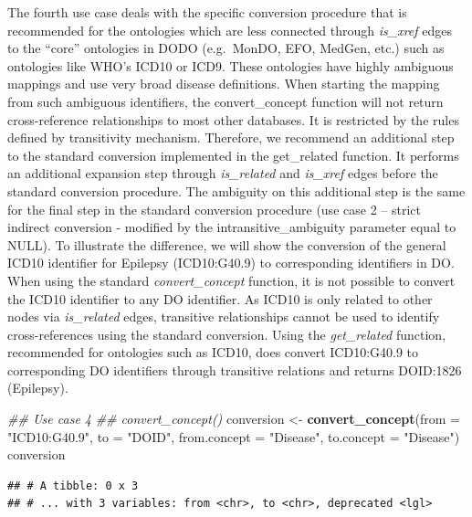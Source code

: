 \documentclass[9pt,a4paper,]{extarticle}
\newenvironment{Shaded}{\begin{snugshade}}{\end{snugshade}}
\newcommand{\CommentTok}[1]{\textcolor[rgb]{0.56,0.35,0.01}{\textit{#1}}}
\newcommand{\DataTypeTok}[1]{\textcolor[rgb]{0.13,0.29,0.53}{#1}}
\newcommand{\KeywordTok}[1]{\textcolor[rgb]{0.13,0.29,0.53}{\textbf{#1}}}
\newcommand{\NormalTok}[1]{#1}
\newcommand{\StringTok}[1]{\textcolor[rgb]{0.31,0.60,0.02}{#1}}
\begin{document}
The fourth use case deals with the specific conversion procedure that is recommended for the ontologies which are less connected through \emph{is\_xref} edges to the ``core'' ontologies in DODO (e.g.~MonDO, EFO, MedGen, etc.) such as ontologies like WHO's ICD10 or ICD9. These ontologies have highly ambiguous mappings and use very broad disease definitions. When starting the mapping from such ambiguous identifiers, the convert\_concept function will not return cross-reference relationships to most other databases. It is restricted by the rules defined by transitivity mechanism. Therefore, we recommend an additional step to the standard conversion implemented in the get\_related function. It performs an additional expansion step through \emph{is\_related} and \emph{is\_xref} edges before the standard conversion procedure. The ambiguity on this additional step is the same for the final step in the standard conversion procedure (use case 2 -- strict indirect conversion - modified by the intransitive\_ambiguity parameter equal to NULL). To illustrate the difference, we will show the conversion of the general ICD10 identifier for Epilepsy (ICD10:G40.9) to corresponding identifiers in DO. When using the standard \emph{convert\_concept} function, it is not possible to convert the ICD10 identifier to any DO identifier. As ICD10 is only related to other nodes via \emph{is\_related} edges, transitive relationships cannot be used to identify cross-references using the standard conversion. Using the \emph{get\_related} function, recommended for ontologies such as ICD10, does convert ICD10:G40.9 to corresponding DO identifiers through transitive relations and returns DOID:1826 (Epilepsy).

\begin{Shaded}
\begin{Highlighting}[]
\CommentTok{## Use case 4}
\CommentTok{## convert_concept()}
\NormalTok{conversion <-}\StringTok{ }\KeywordTok{convert_concept}\NormalTok{(}\DataTypeTok{from =} \StringTok{"ICD10:G40.9"}\NormalTok{,}
                              \DataTypeTok{to =} \StringTok{"DOID"}\NormalTok{, }
                              \DataTypeTok{from.concept =} \StringTok{"Disease"}\NormalTok{,}
                              \DataTypeTok{to.concept =} \StringTok{"Disease"}\NormalTok{)}
\NormalTok{conversion}
\end{Highlighting}
\end{Shaded}

\begin{verbatim}
## # A tibble: 0 x 3
## # ... with 3 variables: from <chr>, to <chr>, deprecated <lgl>
\end{verbatim}
\end{document}
